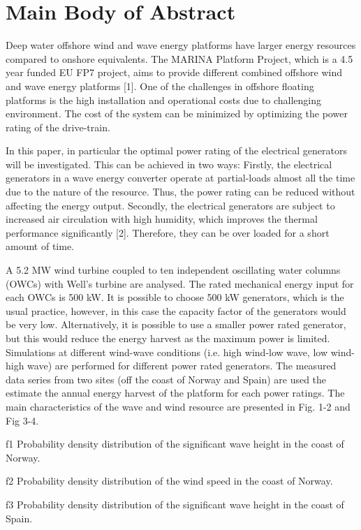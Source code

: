\documentclass[twocolumn]{article}
\begin{document}
\section{Main Body of Abstract}

Deep water offshore wind and wave energy platforms have larger energy resources compared to onshore equivalents. The MARINA Platform Project, which is a 4.5 year funded EU FP7 project, aims to provide different combined offshore wind and wave energy platforms [1]. One of the challenges in offshore floating platforms is the high installation and operational costs due to challenging environment. The cost of the system can be minimized by optimizing the power rating of the drive-train. 

In this paper, in particular the optimal power rating of the electrical generators will be investigated. This can be achieved in two ways: Firstly, the electrical generators in a wave energy converter operate at partial-loads almost all the time due to the nature of the resource. Thus, the power rating can be reduced without affecting the energy output. Secondly, the electrical generators are subject to increased air circulation with high humidity, which improves the thermal performance significantly [2]. Therefore, they can be over loaded for a short amount of time.

A 5.2 MW wind turbine coupled to ten independent oscillating water columns (OWCs) with Well's turbine are analysed. The rated mechanical energy input for each OWCs is 500 kW. It is possible to choose 500 kW generators, which is the usual practice, however, in this case the capacity factor of the generators would be very low. Alternatively, it is possible to use a smaller power rated generator, but this would reduce the energy harvest as the maximum power is limited. Simulations at different wind-wave conditions (i.e. high wind-low wave, low wind-high wave) are performed for different power rated generators. The measured data series from two sites (off the coast of Norway and Spain) are used the estimate the annual energy harvest of the platform for each power ratings. The main characteristics of the wave and wind resource are presented in Fig. 1-2 and Fig 3-4.

{f1} Probability density distribution of the significant wave height in the coast of Norway.

{f2} Probability density distribution of the wind speed in the coast of Norway.

{f3} Probability density distribution of the significant wave height in the coast of Spain.
\end{document}
